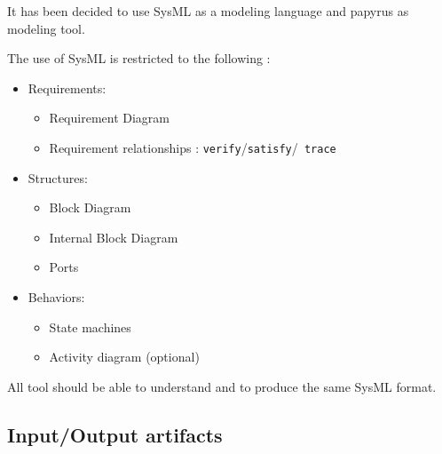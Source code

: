 It has been decided \cite{} to use SysML as a modeling language and
papyrus as modeling tool. 

The use of SysML is restricted to the following :
\begin{itemize}
\item Requirements:
  \begin{itemize}
    \item Requirement Diagram
    \item Requirement relationships : {\tt verify}/{\tt satisfy}/{\tt
        trace}
  \end{itemize}
\item Structures:
  \begin{itemize}
    \item Block Diagram
    \item Internal Block Diagram
    \item Ports
  \end{itemize}
\item Behaviors:
  \begin{itemize}
  \item State machines
  \item Activity diagram (optional)
  \end{itemize}
\end{itemize}

All tool  should be able to understand and to produce the same SysML format.

\subsection{Input/Output artifacts}
